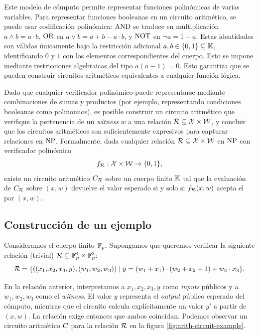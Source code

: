 Este modelo de cómputo permite representar funciones polinómicas de varias variables. Para representar funciones booleanas en un circuito aritmético, se puede usar codificación polinómica: $\mathrm{AND}$ se traduce en multiplicación  $a \wedge b = a \cdot b$, $\mathrm{OR}$ en $a \vee b = a + b - a \cdot b$, y $\mathrm{NOT}$ en $\neg a = 1 - a$. Estas identidades son válidas únicamente bajo la restricción adicional $a, b \in \{0,1\} \subseteq \mathbb{K}$, identificando $0$ y $1$ con los elementos correspondientes del cuerpo. Esto se impone mediante restricciones algebraicas del tipo $a(a - 1) = 0$. Esto garantiza que se pueden construir circuitos aritméticos equivalentes a cualquier función lógica.

Dado que cualquier verificador polinómico puede representarse mediante combinaciones de sumas y productos (por ejemplo, representando condiciones booleanas como polinomios), es posible construir un circuito aritmético que verifique la pertenencia de un \textit{witness} $w$ a una relación $\mathcal{R} \subseteq \mathcal{X} \times \mathcal{W}$, y concluir que los circuitos aritméticos son suficientemente expresivos \cite{arora2006computational} para capturar relaciones en $\mathrm{NP}$. Formalmente, dada cualquier relación $\mathcal{R} \subseteq \mathcal{X} \times \mathcal{W}$ en $\mathrm{NP}$ con verificador polinómico
$$f_{\mathcal{R}} : \mathcal{X} \times \mathcal{W} \to \{0,1\},$$
existe un circuito aritmético $C_{\mathcal{R}}$ sobre un cuerpo finito $\mathbb{K}$ tal que la evaluación de $C_{\mathcal{R}}$ sobre $(x,w)$ devuelve el valor esperado si y solo si $f_{\mathcal{R}}(x,w)$ acepta el par $(x,w)$.

\subsection{Construcción de un ejemplo}
\label{subsec:apendice-b-arithmetic-circuits-construccion-de-un-ejemplo}

Consideramos el cuerpo finito $\mathbb{F}_p$. Supongamos que queremos verificar la siguiente relación (trivial) $\mathcal{R} \subseteq \mathbb{F}_p^4 \times \mathbb{F}_p^3$:
$$\mathcal{R} = \{((x_1, x_2, x_3, y), (w_1, w_2, w_3)) \mid y = (w_1 + x_1) \cdot (w_2 + x_2 + 1) + w_3 \cdot x_3\}.$$

En la relación anterior, interpretamos a $x_1, x_2, x_3, y$ como \textit{inputs} públicos y a $w_1, w_2, w_3$ como el \textit{witness}. El valor $y$ representa el \textit{output} público esperado del cómputo, mientras que el circuito calcula explícitamente un valor $y'$ a partir de $(x,w)$. La relación exige entonces que ambos coincidan. Podemos observar un circuito aritmético $C$ para la relación $\mathcal{R}$ en la figura \ref{fig:arith-circuit-example}.

